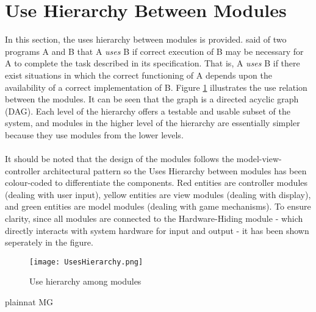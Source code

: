 \documentclass[12pt, titlepage]{article}
\begin{document}
\section{Use Hierarchy Between Modules} \label{SecUse}

In this section, the uses hierarchy between modules is
provided. \citet{Parnas1978} said of two programs A and B that A {\em uses} B if
correct execution of B may be necessary for A to complete the task described in
its specification. That is, A {\em uses} B if there exist situations in which
the correct functioning of A depends upon the availability of a correct
implementation of B.  Figure \ref{FigUH} illustrates the use relation between
the modules. It can be seen that the graph is a directed acyclic graph
(DAG). Each level of the hierarchy offers a testable and usable subset of the
system, and modules in the higher level of the hierarchy are essentially simpler
because they use modules from the lower levels.\\\\
\noindent It should be noted that the design of the modules follows the model-view-controller
architectural pattern so the Uses Hierarchy between modules has been colour-coded to differentiate
the components. Red entities are controller modules (dealing with user input), yellow entities are view 
modules (dealing with display), and green entities are model modules (dealing with game mechanisms).
To ensure clarity, since all modules are connected to the Hardware-Hiding module - which directly interacts
with system hardware for input and output - it has been shown seperately in the figure.

\begin{figure}[H]
\centering
\texttt{[image: UsesHierarchy.png]}
\caption{Use hierarchy among modules}
\label{FigUH}
\end{figure}


 {plainnat}
 {MG}
\end{document}
